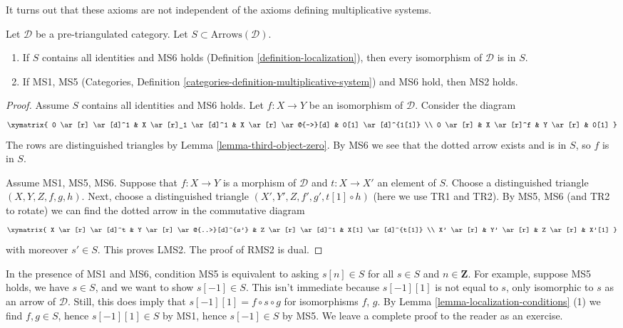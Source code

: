 \noindent
It turns out that these axioms are not independent of the
axioms defining multiplicative systems.

\begin{lemma}
\label{lemma-localization-conditions}
Let $\mathcal{D}$ be a pre-triangulated category.
Let $S \subset \text{Arrows}(\mathcal{D})$.
\begin{enumerate}
\item If $S$ contains all identities and MS6 holds
(Definition \ref{definition-localization}),
then every isomorphism of $\mathcal{D}$ is in $S$.
\item If MS1, MS5 (Categories, Definition
\ref{categories-definition-multiplicative-system}) and MS6 hold,
then MS2 holds.
\end{enumerate}
\end{lemma}

\begin{proof}
Assume $S$ contains all identities and MS6 holds.
Let $f : X \to Y$ be an isomorphism of $\mathcal{D}$.
Consider the diagram
$$
\xymatrix{
0 \ar[r] \ar[d]^1 &
X \ar[r]_1 \ar[d]^1 &
X \ar[r] \ar@{-->}[d] &
0[1] \ar[d]^{1[1]} \\
0 \ar[r] &
X \ar[r]^f &
Y \ar[r] &
0[1]
}
$$
The rows are distinguished triangles by Lemma \ref{lemma-third-object-zero}.
By MS6 we see that the dotted arrow exists and is in $S$, so $f$ is in $S$.

\medskip\noindent
Assume MS1, MS5, MS6.
Suppose that $f : X \to Y$ is a morphism of $\mathcal{D}$ and
$t : X \to X'$ an element of $S$. Choose a distinguished triangle
$(X, Y, Z, f, g, h)$. Next, choose a distinguished triangle
$(X', Y', Z, f', g', t[1] \circ h)$ (here we use TR1 and TR2).
By MS5, MS6 (and TR2 to rotate) we can find the dotted arrow
in the commutative diagram
$$
\xymatrix{
X \ar[r] \ar[d]^t &
Y \ar[r] \ar@{..>}[d]^{s'} &
Z \ar[r] \ar[d]^1 &
X[1] \ar[d]^{t[1]} \\
X' \ar[r] &
Y' \ar[r] &
Z \ar[r] &
X'[1]
}
$$
with moreover $s' \in S$. This proves LMS2. The proof of RMS2 is dual.
\end{proof}

\begin{remark}
\label{remark-MS5}
In the presence of MS1 and MS6, condition MS5 is equivalent to asking
$s[n] \in S$ for all $s \in S$ and $n \in \mathbf{Z}$. For example,
suppose MS5 holds, we have $s \in S$, and we want to show $s[-1] \in S$.
This isn't immediate because $s[-1][1]$ is not equal to $s$, only
isomorphic to $s$ as an arrow of $\mathcal{D}$. Still, this does imply that
$s[-1][1] = f \circ s \circ g$ for isomorphisms $f$, $g$. By
Lemma \ref{lemma-localization-conditions} (1) we find $f, g \in S$,
hence $s[-1][1] \in S$ by MS1, hence $s[-1] \in S$ by MS5.
We leave a complete proof to the reader as an exercise.
\end{remark}


